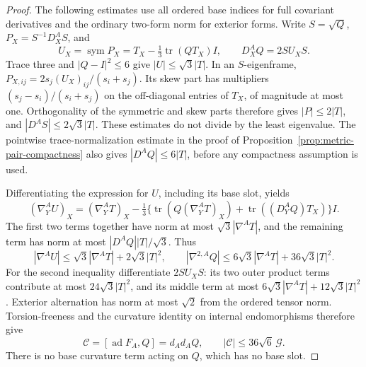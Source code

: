 \documentclass[11pt]{article}
\numberwithin{equation}{section}
\theoremstyle{definition}
\theoremstyle{remark}
\DeclareMathOperator{\tr}{tr}
\begin{document}
\begin{proof}
The following estimates use all ordered base indices for full
covariant derivatives and the ordinary two-form norm for exterior
forms. Write \(S=\sqrt Q\), \(P_X=S^{-1}D_X^AS\), and
\[
 U_X=\operatorname{sym}P_X
       =T_X-\tfrac13\tr(QT_X)I,\qquad D_X^AQ=2SU_XS.
\]
Trace three and \(|Q-I|^2\le6\) give \(|U|\le\sqrt3|T|\).
In an \(S\)-eigenframe,
\(P_{X,ij}=2s_j(U_X)_{ij}/(s_i+s_j)\).
Its skew part has multipliers \((s_j-s_i)/(s_i+s_j)\)
on the off-diagonal entries of \(T_X\), of magnitude at most one.
Orthogonality of the symmetric and skew parts therefore gives
\(|P|\le2|T|\), and \(|D^AS|\le2\sqrt3|T|\).
These estimates do not divide by the least eigenvalue.
The pointwise trace-normalization estimate in the proof of
Proposition~\ref{prop:metric-pair-compactness} also gives
\(|D^AQ|\le6|T|\), before any compactness assumption is used.

Differentiating the expression for \(U\), including its base slot,
yields
\[
 (\nabla_Y^AU)_X=(\nabla_Y^AT)_X
 -\tfrac13\{\tr(Q(\nabla_Y^AT)_X)+\tr((D_Y^AQ)T_X)\}I.
\]
The first two terms together have norm at most
\(\sqrt3|\nabla^AT|\), and the remaining term has norm at
most \(|D^AQ||T|/\sqrt3\). Thus
\[
 |\nabla^AU|\le\sqrt3|\nabla^AT|+2\sqrt3|T|^2,
 \qquad
 |\nabla^{2,A}Q|\le6\sqrt3|\nabla^AT|+36\sqrt3|T|^2.
\]
For the second inequality differentiate \(2SU_XS\): its two
outer product terms contribute at most \(24\sqrt3|T|^2\),
and its middle term at most
\(6\sqrt3|\nabla^AT|+12\sqrt3|T|^2\).
Exterior alternation has norm at most \(\sqrt2\) from the
ordered tensor norm. Torsion-freeness and the curvature identity
on internal endomorphisms therefore give
\begin{equation}\label{eq:strain-curvature-commutator}
 \mathcal C=[\operatorname{ad}F_A,Q]=d_Ad_AQ,
 \qquad |\mathcal C|\le36\sqrt6\,\mathcal G.
\end{equation}
There is no base curvature term acting on \(Q\), which has no base slot.


\end{proof}
\end{document}
